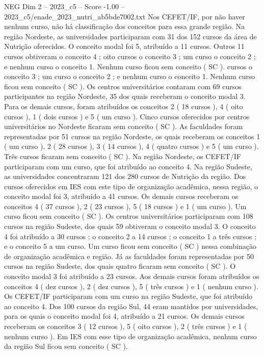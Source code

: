 \begin{textsample}{NEG Dim 2 – 2023\_c5 – Score -1.00 – 2023\_c5/enade\_2023\_nutri\_ab5bde7002.txt}
Nos CEFET/IF, por não haver nenhum curso, não há classificação dos conceitos para essa grande região.
Na região Nordeste, as universidades participaram com 31 dos 152 cursos da área de Nutrição oferecidos.
O conceito modal foi 5, atribuído a 11 cursos.
Outros 11 cursos obtiveram o conceito 4 ; oito cursos o conceito 3 ; um curso o conceito 2 ; e nenhum curso o conceito 1.
Nenhum curso ficou sem conceito ( SC ). cursos o conceito 3 ; um curso o conceito 2 ; e nenhum curso o conceito 1.
Nenhum curso ficou sem conceito ( SC ).
Os centros universitários contaram com 69 cursos participantes na região Nordeste, 35 dos quais receberam o conceito modal 3.
Para os demais cursos, foram atribuídos os conceitos 2 ( 18 cursos ), 4 ( oito cursos ), 1 ( dois cursos ) e 5 ( um curso ).
Cinco cursos oferecidos por centros universitários no Nordeste ficaram sem conceito ( SC ).
As faculdades foram representadas por 51 cursos na região Nordeste, os quais receberam os conceitos 1 ( um curso ), 2 ( 28 cursos ), 3 ( 14 cursos ), 4 ( quatro cursos ) e 5 ( um curso ).
Três cursos ficaram sem conceito ( SC ).
Na região Nordeste, os CEFET/IF participaram com um curso, que foi atribuído ao conceito 4.
Na região Sudeste, as universidades concentraram 121 dos 280 cursos de Nutrição da região.
Dos cursos oferecidos em IES com este tipo de organização acadêmica, nessa região, o conceito modal foi 3, atribuído a 41 cursos.
Os demais cursos receberam os conceitos 4 ( 37 cursos ), 2 ( 23 cursos ), 5 ( 18 cursos ) e 1 ( um curso ).
Um curso ficou sem conceito ( SC ).
Os centros universitários participaram com 108 cursos na região Sudeste, dos quais 59 obtiveram o conceito modal 3.
O conceito 4 foi atribuído a 30 cursos ; o conceito 2 a 14 cursos ; o conceito 1 a três cursos ; e o conceito 5 a um curso.
Um curso ficou sem conceito ( SC ) nessa combinação de organização acadêmica e região.
Já as faculdades foram representadas por 50 cursos na região Sudeste, dos quais quatro ficaram sem conceito ( SC ).
O conceito modal 3 foi atribuído a 23 cursos.
Aos demais cursos foram atribuídos os conceitos 4 ( dez cursos ), 2 ( dez cursos ), 5 ( três cursos ) e 1 ( nenhum curso ).
Os CEFET/IF participaram com um curso na região Sudeste, que foi atribuído ao conceito 4.
Dos 100 cursos da região Sul, 44 eram mantidos por universidades, para os quais o conceito modal foi 4, atribuído a 21 cursos.
Os demais cursos receberam os conceitos 3 ( 12 cursos ), 5 ( oito cursos ), 2 ( três cursos ) e 1 ( nenhum curso ).
Em IES com esse tipo de organização acadêmica, nenhum curso da região Sul ficou sem conceito ( SC ).

\end{textsample}
